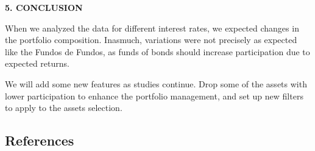 \documentclass[
]{article}
\begin{document}
\begin{center}
\textbf{5. CONCLUSION}
\end{center}

When we analyzed the data for different interest rates, we expected
changes in the portfolio composition. Inasmuch, variations were not
precisely as expected like the Fundos de Fundos, as funds of bonds
should increase participation due to expected returns.

We will add some new features as studies continue. Drop some of the
assets with lower participation to enhance the portfolio management, and
set up new filters to apply to the assets selection.

\newpage

\hypertarget{references}{%
\subsection*{References}\label{references}}
\end{document}
